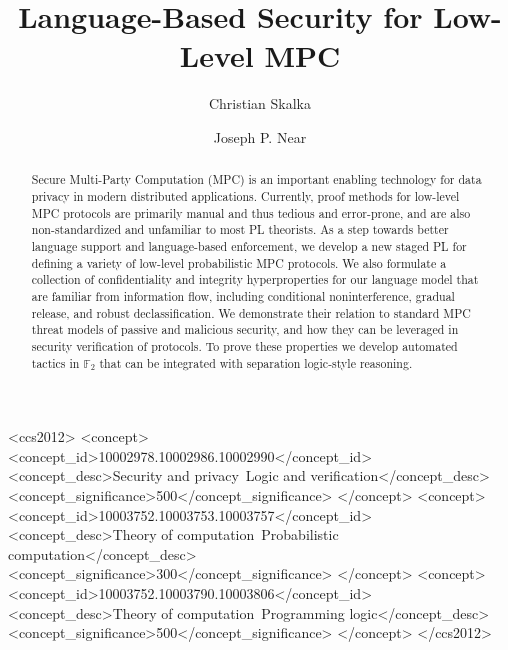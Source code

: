 \documentclass[sigconf]{acmart}
\begin{document}
\title{Language-Based Security for Low-Level MPC}

\author{Christian Skalka}

\author{Joseph P. Near}

\begin{abstract}
  Secure Multi-Party Computation (MPC) is an important
  enabling technology for data privacy in modern distributed
  applications. Currently, proof methods for low-level MPC protocols
  are primarily manual and thus tedious and error-prone, and are also
  non-standardized and unfamiliar to most PL theorists. As a step
  towards better language support and language-based enforcement, we
  develop a new staged PL for defining a variety of low-level
  probabilistic MPC protocols. We also formulate a collection of
  confidentiality and integrity hyperproperties for our language model
  that are familiar from information flow, including conditional
  noninterference, gradual release, and robust declassification. We
  demonstrate their relation to standard MPC threat models of passive
  and malicious security, and how they can be leveraged in security
  verification of protocols. To prove these properties we develop
  automated tactics in $\mathbb{F}_2$ that can be integrated with
  separation logic-style reasoning.
\end{abstract}

\begin{CCSXML}
<ccs2012>
   <concept>
       <concept_id>10002978.10002986.10002990</concept_id>
       <concept_desc>Security and privacy~Logic and verification</concept_desc>
       <concept_significance>500</concept_significance>
       </concept>
   <concept>
       <concept_id>10003752.10003753.10003757</concept_id>
       <concept_desc>Theory of computation~Probabilistic computation</concept_desc>
       <concept_significance>300</concept_significance>
       </concept>
   <concept>
       <concept_id>10003752.10003790.10003806</concept_id>
       <concept_desc>Theory of computation~Programming logic</concept_desc>
       <concept_significance>500</concept_significance>
       </concept>
 </ccs2012>
\end{CCSXML}
\end{document}
